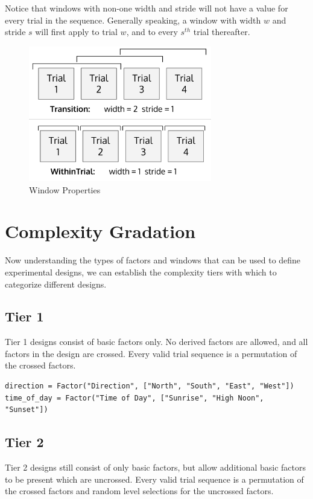 Notice that windows with non-one width and stride will not have a value for every trial in the sequence. Generally speaking, a window with width $w$ and stride $s$ will first apply to trial $w$, and to every $s^{th}$ trial thereafter.

\begin{figure}[t]
\centering
\centerline{\includegraphics[origin=c,width=8cm]{../figures/windows.png}}
\caption{Window Properties}
\label{fig:windows}
\end{figure}


\section{Complexity Gradation}

Now understanding the types of factors and windows that can be used to define experimental designs, we can establish the complexity tiers with which to categorize different designs.

\subsection{Tier 1}

Tier 1 designs consist of basic factors only. No derived factors are allowed, and all factors in the design are crossed. Every valid trial sequence is a permutation of the crossed factors.

\begin{verbatim}
direction = Factor("Direction", ["North", "South", "East", "West"])
time_of_day = Factor("Time of Day", ["Sunrise", "High Noon", "Sunset"])
\end{verbatim}

\subsection{Tier 2}

Tier 2 designs still consist of only basic factors, but allow additional basic factors to be present which are uncrossed. Every valid trial sequence is a permutation of the crossed factors and random level selections for the uncrossed factors.

